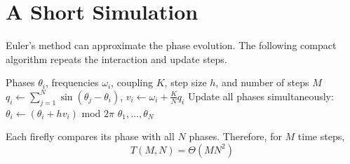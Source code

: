 \section{A Short Simulation}
Euler’s method can approximate the phase evolution. The following compact algorithm repeats the
interaction and update steps.

\begin{algorithm}[H]
    \caption{Simulate the Kuramoto model}
    \label{alg:kuramoto}
    \begin{algorithmic}[1]
        \Require Phases $\theta_{i}$, frequencies $\omega_{i}$, coupling $K$, step size $h$, and number of steps $M$
                \State \(q_{i} \gets \sum_{j=1}^{N}\sin(\theta_{j}-\theta_{i})\), \quad \(v_{i} \gets \omega_{i} + \frac{K}{N}q_{i}\)
            \EndFor
            \State Update all phases simultaneously: \(\theta_{i} \gets (\theta_{i} + hv_{i}) \) mod $2\pi$
        \EndFor
        \State \Return $\theta_{1},\ldots,\theta_{N}$
    \end{algorithmic}
\end{algorithm}

Each firefly compares its phase with all $N$ phases. Therefore, for $M$ time steps,
\begin{equation}
    T(M, N) = \Theta(MN^2)
\end{equation}